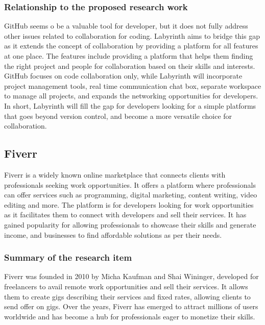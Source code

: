 \documentclass{FastFyp}
\begin{document}
\subsubsection{Relationship to the proposed research work}
GitHub seems o be a valuable tool for developer, but it does not fully address other issues related to collaboration for coding. Labyrinth aims to bridge this gap as it extends the concept of collaboration by providing a platform for all features at one place. The features include providing a platform that helps them finding the right project and people for collaboration based on their skills and interests. GitHub focuses on code collaboration only, while Labyrinth will incorporate project management tools, real time communication chat box, separate workspace to manage all projects, and expands the networking opportunities for developers. In short, Labyrinth will fill the gap for developers looking for a simple platforms that goes beyond version control, and become a more versatile choice for collaboration.

\subsection{Fiverr}
Fiverr is a widely known online marketplace that connects clients with professionals seeking work opportunities. It offers a platform where professionals can offer services such as programming, digital marketing, content writing, video editing and more. The platform is for developers looking for work opportunities as it facilitates them to connect with developers and sell their services. It has gained popularity for allowing professionals to showcase their skills and generate income, and businesses to find affordable solutions as per their needs.
\subsubsection{Summary of the research item}
Fiverr was founded in 2010 by Micha Kaufman and Shai Wininger, developed for freelancers to avail remote work opportunities and sell their services. It allows them to create gigs describing their services and fixed rates, allowing clients to send offer on gigs. Over the years, Fiverr has emerged to attract millions of users worldwide and has become a hub for professionals eager to monetize their skills.
\end{document}
